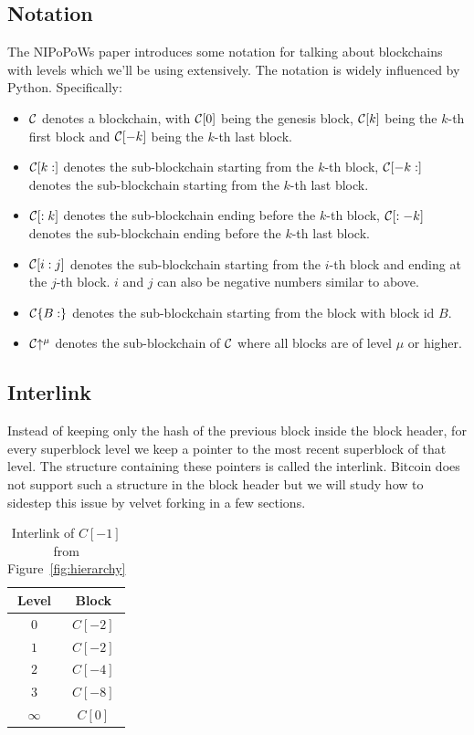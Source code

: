 \subsection{Notation}
The NIPoPoWs paper introduces some notation for talking about blockchains with levels which we'll be using extensively. The notation is widely influenced by Python. Specifically:

\begin{itemize}
  \item $\mathcal{C}$ denotes a blockchain, with $\mathcal{C}[0]$ being the genesis block, $\mathcal{C}[k]$ being the $k$-th first block and $\mathcal{C}[-k]$ being the $k$-th last block.
  \item $\mathcal{C}[k:]$ denotes the sub-blockchain starting from the $k$-th block, $\mathcal{C}[-k:]$ denotes the sub-blockchain starting from the $k$-th last block.
  \item $\mathcal{C}[:k]$ denotes the sub-blockchain ending before the $k$-th block, $\mathcal{C}[:-k]$ denotes the sub-blockchain ending before the $k$-th last block.
  \item $\mathcal{C}[i:j]$ denotes the sub-blockchain starting from the $i$-th block and ending at the $j$-th block. $i$ and $j$ can also be negative numbers similar to above.
  \item $\mathcal{C}\{B:\}$ denotes the sub-blockchain starting from the block with block id $B$.
  \item $\mathcal{C}\negthickspace\uparrow^\mu$ denotes the sub-blockchain of $\mathcal{C}$ where all blocks are of level $\mu$ or higher.
\end{itemize}

\subsection{Interlink}
Instead of keeping only the hash of the previous block inside the block header, for every superblock level we keep a pointer to the most recent superblock of that level. The structure containing these pointers is called the interlink. Bitcoin does not support such a structure in the block header but we will study how to sidestep this issue by velvet forking in a few sections.

\begin{table}
  \centering
  \begin{tabular}{|c|c|}
    \hline
    Level & Block \\
    \hline
    $0$ & $C[-2]$ \\
    $1$ & $C[-2]$ \\
    $2$ & $C[-4]$ \\
    $3$ & $C[-8]$ \\
    $\infty$ & $C[0]$ \\
    \hline
  \end{tabular}
  \caption{Interlink of $C[-1]$ from Figure~\ref{fig:hierarchy}}
  \label{table:interlink-example}
\end{table}

